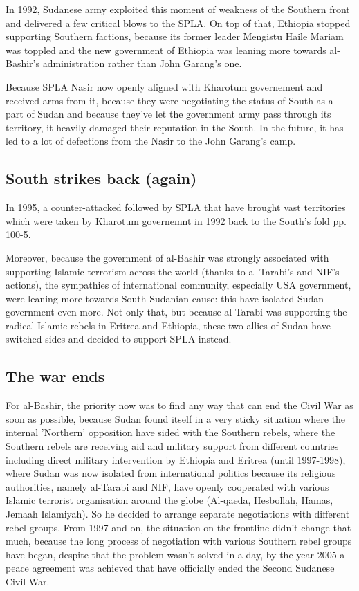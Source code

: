 \documentclass[14pt,a4paper]{article}
\begin{document}
In 1992, Sudanese army exploited this moment of weakness of the Southern front and delivered a few critical blows to the SPLA. On top of that, Ethiopia stopped supporting Southern factions, because its former leader Mengistu Haile Mariam was toppled and the new government of Ethiopia was leaning more towards al-Bashir's administration rather than John Garang's one. 

Because SPLA Nasir now openly aligned with Kharotum governement and received arms from it, because they were negotiating the status of South as a part of Sudan and because they've let the government army pass through its territory, it heavily damaged their reputation in the South. In the future, it has led to a lot of defections from the Nasir to the John Garang's camp. 

\subsection{South strikes back (again)}

In 1995, a counter-attacked followed by SPLA that have brought vast territories which were taken by Kharotum governemnt in 1992 back to the South's fold \cite{johnson2003root} pp. 100-5.

Moreover, because the government of al-Bashir was strongly associated with supporting Islamic terrorism across the world (thanks to al-Tarabi's and NIF's actions), the sympathies of international community, especially USA government, were leaning more towards South Sudanian cause: this have isolated Sudan government even more. 
Not only that, but because al-Tarabi was supporting the radical Islamic rebels in Eritrea and Ethiopia, these two allies of Sudan have switched sides and decided to support SPLA instead. 

\subsection{The war ends}

For al-Bashir, the priority now was to find any way that can end the Civil War as soon as possible, because Sudan found itself in a very sticky situation where the internal 'Northern' opposition have sided with the Southern rebels, where the Southern rebels are receiving aid and military support from different countries including direct military intervention by Ethiopia and Eritrea (until 1997-1998), where Sudan was now isolated from international politics because its religious authorities, namely al-Tarabi and NIF, have openly cooperated with various Islamic terrorist organisation around the globe (Al-qaeda, Hesbollah, Hamas, Jemaah Islamiyah). So he decided to arrange separate negotiations with different rebel groups. From 1997 and on, the situation on the frontline didn't change that much, because the long process of negotiation with various Southern rebel groups have began, despite that the problem wasn't solved in a day, by the year 2005 a peace agreement was achieved that have officially ended the Second Sudanese Civil War. 
\end{document}

